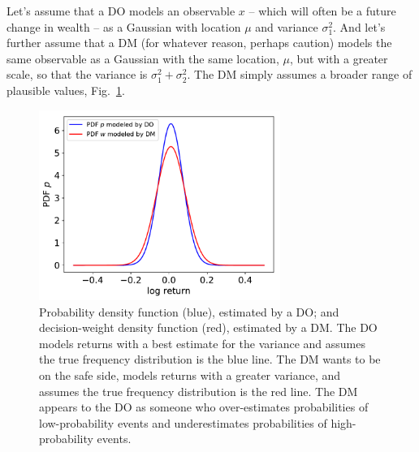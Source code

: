 \documentclass[11pt]{article}
\newcommand{\flabel}[1]{\label{fig:#1}}
\newcommand{\fref}[1]{Fig.~\ref{fig:#1}}
\newcommand{\ND}{\mathcal{N}} %
\numberwithin{equation}{section}
\begin{document}
%

Let's assume that a DO models an observable $x$ -- which will often be a future change in wealth -- as a Gaussian with location $\mu$ and variance $\sigma_1^2$. And let's further assume that a DM (for whatever reason, perhaps caution) models the same observable as a Gaussian with the same location, $\mu$, but with a greater scale, so that the variance is $\sigma_1^2+\sigma_2^2$. The DM simply assumes a broader range of plausible values, \fref{probability_dists}.

\begin{figure}[!htb]
\centering
\includegraphics[width=0.7\textwidth]{./figs/probability_dists.pdf}
\caption{Probability density function (blue), estimated by a DO; and decision-weight density function (red), estimated by a DM. The DO models returns with a best estimate for the variance and assumes the true frequency distribution is the blue line. The DM wants to be on the safe side, models returns with a greater variance, and assumes the true frequency distribution is the red line. The DM appears to the DO as someone who over-estimates probabilities of low-probability events and underestimates probabilities of high-probability events.}
\flabel{probability_dists}
\end{figure}
\end{document}
